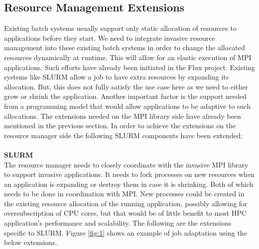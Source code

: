 \subsection{Resource Management Extensions}
Existing batch systems usually support only static allocation of resources to applications before they start. We need to integrate invasive resource management into these existing batch systems in order to change the allocated resources dynamically at runtime. This will allow for an elastic execution of MPI applications. Such efforts have already been initiated in the Flux project. Existing systems like SLURM allow a job to have extra resources by expanding its allocation. But, this does not fully satisfy the use case here as we need to either grow or shrink the application. Another important factor is the support needed from a programming model that would allow applications to be adaptive to such allocations. The extensions needed on the MPI library side have already been mentioned in the previous section. In order to achieve the extensions on the resource manager side the following SLURM components have been extended:\\ \\
\textbf{SLURM}\\
The resource manager needs to closely coordinate with the invasive MPI library to support invasive applications. It needs to fork processes on new resources when an application is expanding or destroy them in case it is shrinking. Both of which needs to be done in coordination with MPI. New processes could be created in the existing resource allocation of the running application, possibly allowing for oversubscription of CPU cores, but that would be of little benefit to most HPC application's performance and scalability. The following are the extensions specific to SLURM. Figure \ref{fig:1} shows an example of job adaptation using the below extensions.\\ \\
